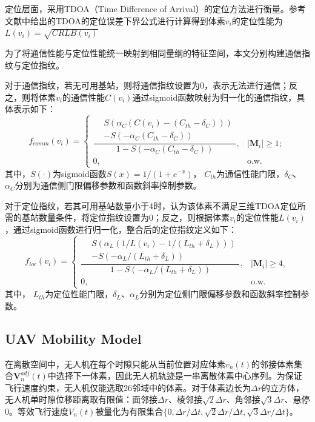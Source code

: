 \documentclass[lettersize,journal]{IEEEtran}
\begin{document}
定位层面，采用TDOA（Time Difference of Arrival）的定位方法进行衡量。参考文献\cite{ref16}中给出的TDOA的定位误差下界公式进行计算得到体素$v_i$的定位性能为$L(v_i)=\sqrt{CRLB(v_i)}$

为了将通信性能与定位性能统一映射到相同量纲的特征空间，本文分别构建通信指纹与定位指纹。

对于通信指纹，若无可用基站，则将通信指纹设置为0，表示无法进行通信；反之，则将体素$v_i$的通信性能$C(v_i)$通过sigmoid函数映射为归一化的通信指纹，具体表示如下：
\begin{equation}
f_{comm}(v_i)=
\begin{cases}
\dfrac{
\begin{aligned}
&S\left(\alpha_C\left(C(v_i)-(C_{th}-\delta_C)\right)\right)\\[-0.2ex]
&-S\left(-\alpha_C(C_{th}-\delta_C)\right)
\end{aligned}}
{1-S\left(-\alpha_C(C_{th}-\delta_C)\right)}, & |\mathbf{M}_i|\ge 1;\\[3ex]
0, & \text{o.w.}
\end{cases}
\end{equation}
其中，$S(\cdot)$为sigmoid函数$S(x)=1/(1+e^{-x})$， $C_{th}$为通信性能门限，$\delta_C$、$\alpha_C$分别为通信侧门限偏移参数和函数斜率控制参数。

对于定位指纹，若其可用基站数量小于4时，认为该体素不满足三维TDOA定位所需的基站数量条件，将定位指纹设置为0；反之，则根据体素$v_i$的定位性能$L(v_i)$，通过sigmoid函数进行归一化，整合后的定位指纹定义如下：
\begin{equation}
f_{loc}(v_i)=
\begin{cases}
\dfrac{
\begin{aligned}
&S\left(\alpha_L\left(1/L(v_i)-1/(L_{th}+\delta_L)\right)\right)\\[-0.2ex]
&-S\left(-\alpha_L/(L_{th}+\delta_L)\right)
\end{aligned}}
{1-S\left(-\alpha_L/(L_{th}+\delta_L)\right)}, & |\mathbf{M}_i|\ge 4,\\[3ex]
0, & \text{o.w.}
\end{cases}
\end{equation}
其中， $L_{th}$为定位性能门限，$\delta_L$、$\alpha_L$分别为定位侧门限偏移参数和函数斜率控制参数。

\subsection{UAV Mobility Model}

在离散空间中，无人机在每个时隙只能从当前位置对应体素$v_n(t)$的邻接体素集合$\mathbf{V}_n^{adj}(t)$中选择下一体素，因此无人机轨迹是一串离散体素中心序列。为保证飞行速度约束，无人机仅能选取26邻域中的体素。对于体素边长为$\Delta r$的立方体，无人机单时隙位移距离取有限值：面邻接$\Delta r$、棱邻接$\sqrt{2}\Delta r$、角邻接$\sqrt{3}\Delta r$、悬停0。等效飞行速度$V_n(t)$被量化为有限集合$\{0,\Delta r/\Delta t,\sqrt{2}\Delta r/\Delta t,\sqrt{3}\Delta r/\Delta t\}$。
\end{document}

